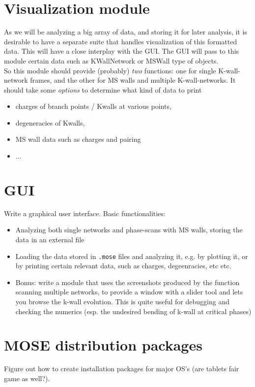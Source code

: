 \documentclass[11pt]{report}
\begin{document}
\section{Visualization module}
As we will be analyzing a big array of data, and storing it for later analysis, it is desirable to have a separate suite that handles visualization of this formatted data.
This will have a close interplay with the GUI. The GUI will pass to this module certain data such as KWallNetwork or MSWall type of objects.\\
So this module should provide (probably) \emph{two} functions: one for single K-wall-network frames, and the other for MS walls and multiple K-wall-networks. 
It should take some \emph{options} to determine what kind of data to print 
\begin{itemize}
\item charges of branch points / Kwalls at various points, 
\item degeneracies of Kwalls, 
\item MS wall data such as charges and pairing
\item ...
\end{itemize}




\section{GUI}
Write a graphical user interface. Basic functionalities:
\begin{itemize}
	\item Analyzing both single networks and phase-scans with MS walls, storing the data in an external file
	\item Loading the data stored in {\tt*.mose} files and analyzing it, e.g. by plotting it, or by printing certain relevant data, such as charges, degeenracies, etc etc.
	\item Bonus: write a module that uses the screenshots produced by the function scanning multiple networks, to provide a window with a slider tool and lets you browse the k-wall evolution. This is quite useful for debugging and checking the numerics (esp. the undesired bending of k-wall at critical phases)
\end{itemize}



\section{MOSE distribution packages}
Figure out how to create installation packages for major OS's (are tablets fair game as well?).
\end{document}
